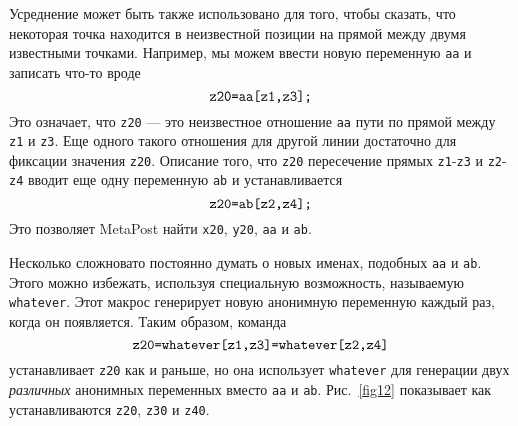 \documentclass{article} %
\begin{document}
Усреднение может быть также использовано для того, чтобы сказать, что 
некоторая точка находится в неизвестной позиции на прямой между двумя 
известными точками.
Например, мы можем ввести новую переменную {\tt aa} и записать что-то вроде
$$ \hbox{\verb|z20=aa[z1,z3];|} $$
Это означает, что {\tt z20} --- это неизвестное отношение {\tt aa} пути 
по прямой между {\tt z1} и {\tt z3}.
Еще одного такого отношения для другой линии достаточно для фиксации 
значения {\tt z20}.
Описание того, что {\tt z20} пересечение прямых {\tt z1}-{\tt z3}
и {\tt z2}-{\tt z4} вводит еще одну переменную {\tt ab} и устанавливается 
$$ \hbox{\verb|z20=ab[z2,z4];|} $$
Это позволяет MetaPost найти {\tt x20}, {\tt y20}, {\tt aa} и {\tt ab}.

Несколько сложновато постоянно думать о новых именах, подобных {\tt aa} и 
{\tt ab}.
Этого можно избежать, используя специальную возможность, называемую 
{\tt whatever}\label{Dwhatev}.
Этот макрос генерирует новую анонимную переменную каждый раз, когда он 
появляется.
Таким образом, команда
$$ \hbox{\verb|z20=whatever[z1,z3]=whatever[z2,z4]|} $$
устанавливает {\tt z20} как и раньше, но она использует 
{\tt whatever} для генерации двух {\em различных\/} анонимных переменных 
вместо {\tt aa} и {\tt ab}.
Рис.~\ref{fig12} показывает как устанавливаются {\tt z20}, {\tt z30} и
{\tt z40}.
\end{document}
